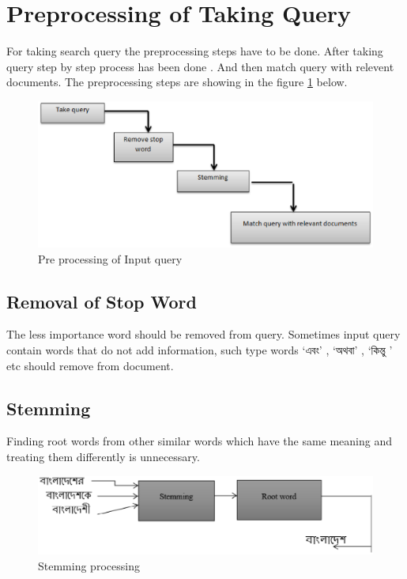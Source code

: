 \section{Preprocessing of Taking Query}

For taking search query the preprocessing steps have to be done. After taking query step by step process has been done . And then match query with relevent documents. The preprocessing steps are showing in the figure \ref{Figure:inquery} below.


\begin{figure}[htp]
	\centering
		\includegraphics[width=.65\textwidth]{figure/three.eps}
	\caption{Pre processing of Input query}
	\label{Figure:inquery}
\end{figure}


\subsection{Removal of Stop Word}

The less importance word should be removed from query. Sometimes input query contain words that do not add information, such type words ‘এবং’ , ‘অথবা’ , ‘কিন্তু ’ etc should remove from document.

\subsection{Stemming}

Finding  root words from other similar words which have the same meaning and treating them differently is unnecessary.

\begin{figure}[htp]
	\centering
		\includegraphics[width=.65\textwidth]{figure/four.eps}
	\caption{Stemming processing}
	\label{Figure:stemm}
\end{figure}


